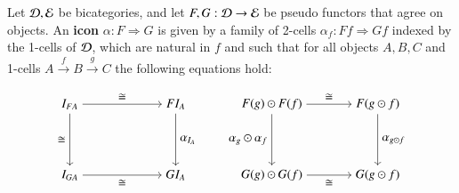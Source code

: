 \begin{defn}
Let $\mathcal{D}, \mathcal{E}$ be bicategories, and let $F,G: \mathcal{D} \rightarrow \mathcal{E}$ be pseudo functors that agree on objects. An \textbf{icon} $\alpha: F \Rightarrow G$ is given by a family of 2-cells $\alpha_f : Ff \Rightarrow Gf$ indexed by the 1-cells of $\mathcal{D}$, which are natural in $f$ and such that for all objects $A, B, C$ and 1-cells $A \xrightarrow{f} B \xrightarrow{g} C$ the following equations hold:

\begin{equation}\label{eq:iconeq}
\begin{aligned}
\begin{tikzpicture}[yscale=2,xscale=3]
\node (tl) at (0,1) {$I_{FA}$};
\node (tr) at (1,1) {$F I_A$};
\node (bl) at (0,0) {$I_{GA}$};
\node (br) at (1,0) {$GI_A$};
\draw[->] (tl) to node[above]{$\iso$} (tr);
\draw[->] (bl) to node[below]{$\iso$} (br);
\draw[->] (tl) to node[left]{$\iso$} (bl);
\draw[->] (tr) to node[right]{$\alpha_{I_A}$} (br);
\end{tikzpicture}
\end{aligned}
\qquad
\begin{aligned}\begin{tikzpicture}[yscale=2, xscale=3]
\node (tl) at (0,1) {$F(g) \odot F(f)$};
\node (tr) at (1,1) {$F(g \odot f)$};
\node (bl) at (0,0) {$G(g) \odot G(f)$};
\node (br) at (1,0) {$G(g \odot f)$};
\draw[->] (tl) to node[above]{$\iso$} (tr);
\draw[->] (bl) to node[below]{$\iso$} (br);
\draw[->] (tl) to node[left]{$\alpha_g \odot \alpha_f$}(bl);
\draw[->] (tr) to node[right]{$\alpha_{g \odot f}$} (br);
\end{tikzpicture}
\end{aligned}
\end{equation}
\end{defn}



